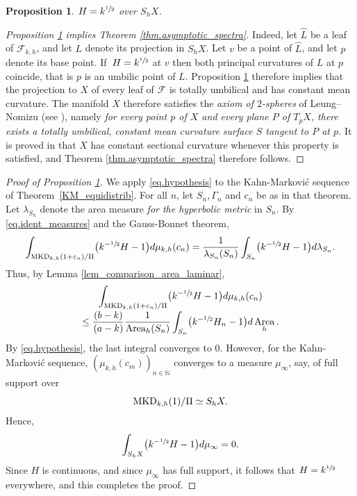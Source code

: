 \documentclass[JEP,XML,SOM,Unicode,NoEqCountersInSection,published]{cedram}
\theoremstyle{plain}
\newtheorem{prop}[theorem]{Proposition}
\theoremstyle{definition}
\newcommand{\cF}{{\mathcal F}}
\let\eps\varepsilon
\newcommand{\MKD}{\mathrm{MKD}}
\DeclareMathOperator{\Area}{Area}
\begin{document}
\begin{prop}\label{p.tot_asymptotic}
$H=k^{\sfrac{1}{2}}$ over $S_hX$.
\end{prop}

\begin{proof}[Proposition \ref{p.tot_asymptotic} implies Theorem \ref{thm.asymptotic_spectra}]
Indeed, let $\hat L$ be a leaf of $\cF_{k,h}$, and let $L$ denote its projection in $S_hX$. Let $v$ be a point of $\hat L$, and let $p$ denote its base point. If~$H=k^{\sfrac{1}{2}}$ at $v$ then both principal curvatures of $L$ at $p$ coincide, that is $p$ is an umbilic point of $L$. Proposition \ref{p.tot_asymptotic} therefore implies that the projection to $X$ of every leaf of $\cF$ is totally umbilical and has constant mean curvature. The manifold $X$ therefore satisfies the \emph{axiom of $2$-spheres} of Leung--Nomizu (see \cite{Leung_Nomizu}), namely \emph{for every point $p$ of $X$ and every plane $P$ of $T_pX$, there exists a totally umbilical, constant mean curvature surface $S$ tangent to $P$ at $p$.} It is proved in \cite{Leung_Nomizu} that $X$ has constant sectional curvature whenever this property is satisfied, and Theorem \ref{thm.asymptotic_spectra} therefore follows.
\end{proof}

\begin{proof}[Proof of Proposition \ref{p.tot_asymptotic}] We apply \eqref{eq.hypothesis} to the Kahn-Markovi\'c sequence of Theo\-rem~\ref{KM_equidistrib}. For all $n$, let $S_n,\Gamma_n$ and $c_n$ be as in that theorem. Let $\lambda_{S_n}$ denote the area measure \emph{for the hyperbolic metric} in $S_n$. By \eqref{eq.ident_measures} and the Gauss-Bonnet theorem,
\begin{equation*}
\int_{\MKD_{k,h}(1+\eps_n)/\Pi}\bigl(k^{-\sfrac{1}{2}}H-1\bigr)d\mu_{k,h}(c_n)=
\frac{1}{\lambda_{S_n}(S_n)}\int_{S_n}\bigl(k^{-\sfrac{1}{2}}H-1\bigr)d\lambda_{S_n}.
\end{equation*}
Thus, by Lemma \ref{lem_comparison_area_laminar},\vspace*{-3pt}
\begin{multline*}
\int_{\MKD_{k,h}(1+\eps_n)/\Pi}\bigl(k^{-\sfrac{1}{2}}H-1\bigr)d\mu_{k,h}(c_n)\\[-3pt]
\leq\frac{(b-k)}{(a-k)}\frac{1}{\Area_h(S_n)}\int_{S_n}\bigl(k^{-\sfrac{1}{2}}H_n-1\bigr)d\Area_h.
\end{multline*}
By \eqref{eq.hypothesis}, the last integral converges to $0$. However, for the Kahn-Markovi\'c sequence, $(\mu_{k,h}(c_m))_{n\in\mathbb{N}}$ converges to a measure $\mu_\infty$, say, of full support over
\[
\MKD_{k,h}(1)/\Pi\simeq\nobreak S_hX.
\]
Hence,
\begin{equation*}
\int_{S_hX}\bigl(k^{-\sfrac{1}{2}}H-1\bigr)d\mu_\infty = 0.
\end{equation*}
Since $H$ is continuous, and since $\mu_\infty$ has full support, it follows that $H=k^{\sfrac{1}{2}}$ everywhere, and this completes the proof.
\end{proof}
\end{document}
